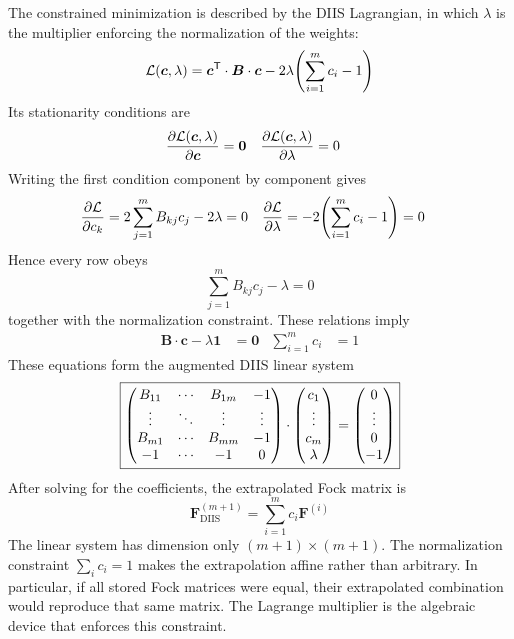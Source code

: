 \documentclass[11pt,a4paper,titlepage]{article}
\numberwithin{equation}{section}
\newcommand{\bc}{\boldsymbol{c}}
\newcommand{\bB}{\boldsymbol{B}}
\newcommand{\bF}{\boldsymbol{F}}
\newcommand{\bO}{\boldsymbol{0}}
\newcommand{\red}[1]{\textcolor{hfRed}{#1}}
\begin{document}
The constrained minimization is described by the DIIS Lagrangian, in which
$\lambda$ is the multiplier enforcing the normalization of the weights:
\begin{equation}
  \mathcal{L}(\bc,\lambda)
  =\bc^\mathsf{T}\cdot\bB\cdot\bc
  -2\lambda\qty(\sum_{i=1}^{m}c_i-1)
\end{equation}
Its stationarity conditions are
\begin{align}
  \pdv{\mathcal{L}(\bc,\lambda)}{\bc}&=\bO
  &
  \pdv{\mathcal{L}(\bc,\lambda)}{\lambda}&=0
\end{align}
Writing the first condition component by component gives
\begin{align}
  \pdv{\mathcal L}{c_k}
  &=
  2\sum_{j=1}^{m}B_{kj}c_j-2\lambda
  =
  0
  &
  \pdv{\mathcal L}{\lambda}
  &=
  -2\qty(\sum_{i=1}^{m}c_i-1)
  =
  0
\end{align}
Hence every row obeys
\begin{equation}
  \sum_{j=1}^{m}B_{kj}c_j-\lambda=0
\end{equation}
together with the normalization constraint. These relations imply
\begin{align}
  \bB\cdot\bc-\lambda\boldsymbol{1}&=\bO
  &
  \sum_{i=1}^{m}c_i&=1
\end{align}
These equations form the augmented DIIS linear system
\begin{equation}
  \boxed{
  \pmqty{
    B_{11}&\cdots&B_{1m}&-1\\
    \vdots&\ddots&\vdots&\vdots\\
    B_{m1}&\cdots&B_{mm}&-1\\
    -1&\cdots&-1&0
  }
  \cdot
  \pmqty{
    c_1\\ \vdots\\ c_m\\ \lambda
  }
  =
  \pmqty{
    0\\ \vdots\\ 0\\ -1
  }
  }
\end{equation}
After solving for the coefficients, the extrapolated Fock matrix is
\begin{equation}
    \bF_\text{DIIS}^{(m+1)}
    =\sum_{i=1}^{m}c_i\bF^{(i)}
\end{equation}
The linear system has dimension only \red{$(m+1)\times(m+1)$}.
The normalization constraint $\sum_i c_i=1$ makes the extrapolation affine
rather than arbitrary. In particular, if all stored Fock matrices were equal,
their extrapolated combination would reproduce that same matrix. The
Lagrange multiplier is the algebraic device that enforces this constraint.
\end{document}
